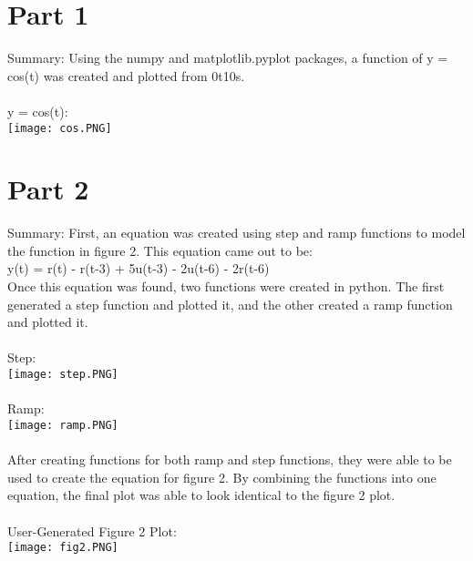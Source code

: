 \documentclass[12pt]{report}
\begin{document}
\section{Part 1}
Summary: Using the numpy and matplotlib.pyplot packages, a function of y = cos(t) was created and plotted from 0\le t\le 10s.
\\ \\y = cos(t):
\\ \texttt{[image: cos.PNG]}
\section{Part 2}
Summary: First, an equation was created using step and ramp functions to model the function in figure 2. This equation came out to be: \\y(t) = r(t) - r(t-3) + 5u(t-3) - 2u(t-6) - 2r(t-6)
\\ Once this equation was found, two functions were created in python. The first generated a step function and plotted it, and the other created a ramp function and plotted it. 
\\ \\Step:
\\ \texttt{[image: step.PNG]}
\\ \\Ramp:
\\ \texttt{[image: ramp.PNG]}
\\ \\After creating functions for both ramp and step functions, they were able to be used to create the equation for figure 2. By combining the functions into one equation, the final plot was able to look identical to the figure 2 plot.
\\ \\User-Generated Figure 2 Plot:
\\ \texttt{[image: fig2.PNG]}
\end{document}
